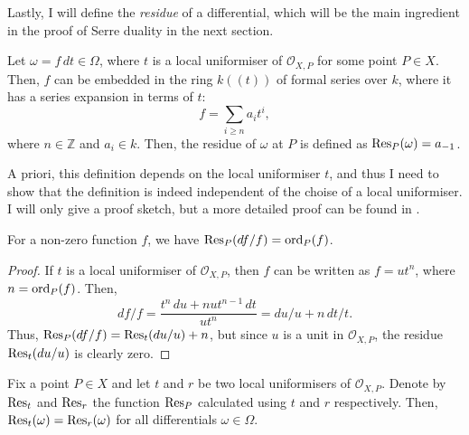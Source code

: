 Lastly, I will define the \emph{residue} of a differential, which will be
the main ingredient in the proof of Serre duality in the next section.
\begin{defin}
  Let $\omega=f\,dt\in\Omega$, where $t$ is a local uniformiser of
  $\mathscr{O}_{X,P}$ for some point $P\in X$. Then, $f$ can be embedded
  in the ring $k((t))$ of formal series over $k$, where it has a series
  expansion in terms of $t$:
  \[
    f=\sum_{i\geq n}a_{i}t^{i},
  \]
  where $n\in\mathbb{Z}$ and $a_{i}\in k$. Then, the residue of $\omega$
  at $P$ is defined as $\operatorname{Res}_{P}(\omega)=a_{-1}$.
\end{defin}
A priori, this definition depends on the local uniformiser $t$, and thus
I need to show that the definition is indeed independent of the choise
of a local uniformiser. I will only give a proof sketch, but a more detailed
proof can be found in \cite{serre}.
\begin{lemm}\label{lemm:res_quotient}
  For a non-zero function $f$, we have $\operatorname{Res}_{P}(df/f)=\operatorname{ord}_{P}(f)$.
\end{lemm}
\begin{proof}
  If $t$ is a local uniformiser of $\mathscr{O}_{X,P}$, then $f$ can be
  written as $f=ut^{n}$, where $n=\operatorname{ord}_{P}(f)$. Then,
  \[
    df/f = \frac{t^{n}\,du + nut^{n-1}\,dt}{ut^{n}}=du/u+n\,dt/t.
  \]
  Thus, $\operatorname{Res}_{P}(df/f)=\operatorname{Res}_{t}(du/u)+n$, but since $u$ is a unit in
  $\mathscr{O}_{X,P}$, the residue $\operatorname{Res}_{t}(du/u)$ is clearly zero.
\end{proof}
\begin{prop}
  Fix a point $P\in X$ and let $t$ and $r$ be two local uniformisers of
  $\mathscr{O}_{X,P}$. Denote by $\operatorname{Res}_{t}$ and $\operatorname{Res}_{r}$ the function
  $\operatorname{Res}_{P}$ calculated using $t$ and $r$ respectively. Then,
  $\operatorname{Res}_{t}(\omega)=\operatorname{Res}_{r}(\omega)$ for all differentials $\omega\in\Omega$.
\end{prop}
